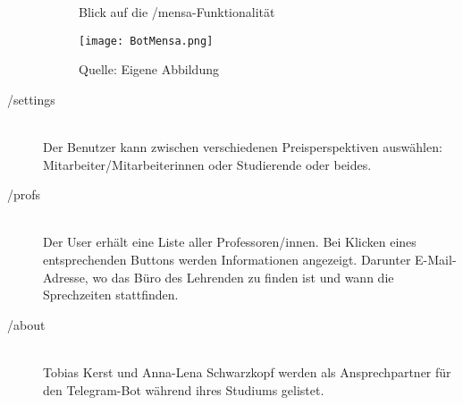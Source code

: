 \begin{description}
  \begin{figure}[!htb]
      \centering
      \caption{Blick auf die /mensa-Funktionalität}
        \texttt{[image: BotMensa.png]}
      \caption*{Quelle: Eigene Abbildung}
  \end{figure}
  \item[/settings] \hfill \\
  Der Benutzer kann zwischen verschiedenen Preisperspektiven auswählen: Mitarbeiter/Mitarbeiterinnen oder Studierende oder beides.
  \item[/profs] \hfill \\
  Der User erhält eine Liste aller Professoren/innen. Bei Klicken eines entsprechenden Buttons werden Informationen angezeigt. Darunter E-Mail-Adresse, wo das Büro des Lehrenden zu finden ist und wann die Sprechzeiten stattfinden.
  \item[/about] \hfill \\
  Tobias Kerst und Anna-Lena Schwarzkopf werden als Ansprechpartner für den Telegram-Bot während ihres Studiums gelistet.
\end{description}
